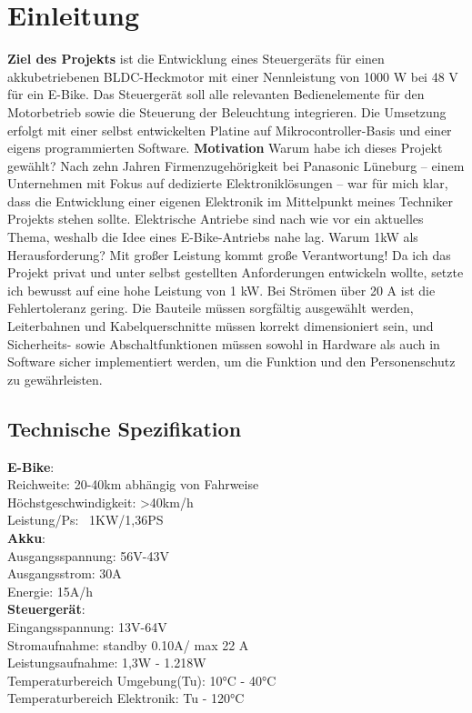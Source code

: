\documentclass[paper=a4,11pt]{scrreprt}
\begin{document}
\chapter{Einleitung}
\textbf{Ziel des Projekts} ist die Entwicklung eines Steuergeräts für einen akkubetriebenen BLDC-Heckmotor mit einer Nennleistung von 1000 W bei 48 V für ein E-Bike. Das Steuergerät soll alle relevanten Bedienelemente für den Motorbetrieb sowie die Steuerung der Beleuchtung integrieren. Die Umsetzung erfolgt mit einer selbst entwickelten Platine auf Mikrocontroller-Basis und einer eigens programmierten Software.
\textbf{Motivation}
Warum habe ich dieses Projekt gewählt? 
Nach zehn Jahren Firmenzugehörigkeit bei Panasonic Lüneburg – einem Unternehmen mit Fokus auf dedizierte Elektroniklösungen – war für mich klar, dass die Entwicklung einer eigenen Elektronik im Mittelpunkt meines Techniker Projekts stehen sollte. Elektrische Antriebe sind nach wie vor ein aktuelles Thema, weshalb die Idee eines E-Bike-Antriebs nahe lag.
Warum 1kW als Herausforderung?
Mit großer Leistung kommt große Verantwortung! Da ich das Projekt privat und unter selbst gestellten Anforderungen entwickeln wollte, setzte ich bewusst auf eine hohe Leistung von 1 kW. Bei Strömen über 20 A ist die Fehlertoleranz gering. Die Bauteile müssen sorgfältig ausgewählt werden, Leiterbahnen und Kabelquerschnitte müssen korrekt dimensioniert sein, und Sicherheits- sowie Abschaltfunktionen müssen sowohl in Hardware als auch in Software sicher implementiert werden, um die Funktion und den Personenschutz zu gewährleisten.
\section{Technische Spezifikation}
\textbf{E-Bike}:\\
Reichweite: 20-40km abhängig von Fahrweise\\
Höchstgeschwindigkeit: >40km/h\\
Leistung/Ps: ~1KW/1,36PS\\
\textbf{Akku}:\\
Ausgangsspannung: 56V-43V\\
Ausgangsstrom: 30A\\
Energie: 15A/h\\
\textbf{Steuergerät}:\\
Eingangsspannung: 13V-64V\\
Stromaufnahme: standby 0.10A/ max 22 A \\
Leistungsaufnahme: 1,3W - 1.218W\\
Temperaturbereich Umgebung(Tu): 10°C - 40°C\\
Temperaturbereich Elektronik: Tu - 120°C\\
\end{document}
